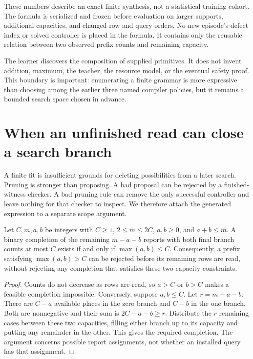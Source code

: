 These numbers describe an exact finite synthesis, not a statistical training cohort. The formula is serialized and frozen before evaluation on larger supports, additional capacities, and changed row and query orders. No new episode's defect index or solved controller is placed in the formula. It contains only the reusable relation between two observed prefix counts and remaining capacity.

The learner discovers the composition of supplied primitives. It does not invent addition, maximum, the teacher, the resource model, or the eventual safety proof. This boundary is important: enumerating a finite grammar is more expressive than choosing among the earlier three named compiler policies, but it remains a bounded search space chosen in advance.

\section{When an unfinished read can close a search branch}\label{SII:sec:prefix-pruning}
A finite fit is insufficient grounds for deleting possibilities from a later search. Pruning is stronger than proposing. A bad proposal can be rejected by a finished-witness checker. A bad pruning rule can remove the only successful controller and leave nothing for that checker to inspect. We therefore attach the generated expression to a separate scope argument.

\begin{SIIproposition}\label{SII:prop:prefix-capacity}
Let $C,m,a,b$ be integers with $C\geq1$, $2\leq m\leq2C$, $a,b\geq0$, and $a+b\leq m$. A binary completion of the remaining $m-a-b$ reports with both final branch counts at most $C$ exists if and only if $\max(a,b)\leq C$. Consequently, a prefix satisfying $\max(a,b)>C$ can be rejected before its remaining rows are read, without rejecting any completion that satisfies these two capacity constraints.
\end{SIIproposition}
\begin{proof}
Counts do not decrease as rows are read, so $a>C$ or $b>C$ makes a feasible completion impossible. Conversely, suppose $a,b\leq C$. Let $r=m-a-b$. There are $C-a$ available places in the zero branch and $C-b$ in the one branch. Both are nonnegative and their sum is $2C-a-b\geq r$. Distribute the $r$ remaining cases between these two capacities, filling either branch up to its capacity and putting any remainder in the other. This gives the required completion. The argument concerns possible report assignments, not whether an installed query has that assignment.
\end{proof}

